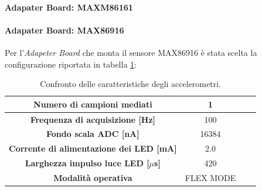 \paragraph{Adapater Board: MAXM86161}
\paragraph{Adapater Board: MAX86916}
Per l'\textit{Adapeter Board} che monta il sensore MAX86916 è stata scelta la configurazione riportata in tabella \ref{tab:ConfigMAX86916}:
\begin{table}[h]
	\renewcommand{\arraystretch}{1.5}
	\centering
	\footnotesize
	\begin{tabular}{cccc}
		\textbf{Numero di campioni mediati} & 1 \\ \hline
		\textbf{Frequenza di acquisizione [Hz]} & 100 \\ \hline
		\textbf{Fondo scala ADC [nA]} & 16384 \\ \hline
		\textbf{Corrente di alimentazione dei LED [mA]} & 2.0 \\ \hline
		\textbf{Larghezza impulso luce LED [$\mu$s]} & 420 \\ \hline
		\textbf{Modalità operativa} & FLEX MODE \\ \hline
	\end{tabular}
	\caption{Confronto delle caratteristiche degli accelerometri.}
	\label{tab:ConfigMAX86916}
\end{table}



